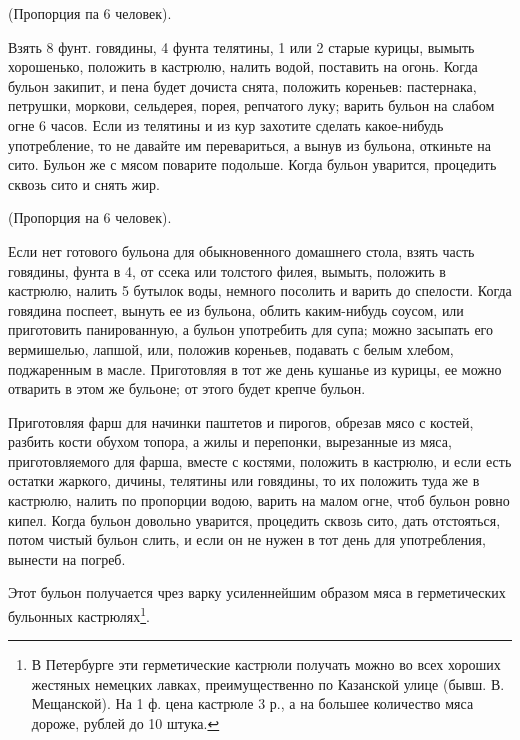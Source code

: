 
(Пропорция па 6 человек).

Взять 8 фунт. говядины, 4 фунта телятины, 1 или 2 старые курицы, вымыть хорошенько, положить в кастрюлю, налить водой, поставить на огонь. Когда бульон закипит, и пена будет дочиста снята, положить кореньев: пастернака, петрушки, моркови, сельдерея, порея, репчатого луку; варить бульон на слабом огне 6 часов. Если из телятины и из кур захотите сделать какое-нибудь употребление, то не давайте им перевариться, а вынув из бульона, откиньте на сито. Бульон же с мясом поварите подольше. Когда бульон уварится, процедить сквозь сито и снять жир.


(Пропорция на 6 человек).

Если нет готового бульона для обыкновенного домашнего стола, взять часть говядины, фунта в 4, от ссека или толстого филея, вымыть, положить в кастрюлю, налить 5 бутылок воды, немного посолить и варить до спелости. Когда говядина поспеет, вынуть ее из бульона, облить каким-нибудь соусом, или приготовить панированную, а бульон употребить для супа; можно засыпать его вермишелью, лапшой, или, положив кореньев, подавать с белым хлебом, поджаренным в масле. Приготовляя в тот же день кушанье из курицы, ее можно отварить в этом же бульоне; от этого будет крепче бульон.


Приготовляя фарш для начинки паштетов и пирогов, обрезав мясо с костей, разбить кости обухом топора, а жилы и перепонки, вырезанные из мяса, приготовляемого для фарша, вместе с костями, положить в кастрюлю, и если есть остатки жаркого, дичины, телятины или говядины, то их положить туда же в кастрюлю, налить по пропорции водою, варить на малом огне, чтоб бульон ровно кипел. Когда бульон довольно уварится, процедить сквозь сито, дать отстояться, потом чистый бульон слить, и если он не нужен в тот день для употребления, вынести на погреб.


Этот бульон получается чрез варку усиленнейшим образом мяса в герметических бульонных кастрюлях\footnote{В Петербурге эти герметические кастрюли получать можно во всех хороших жестяных немецких лавках, преимущественно по Казанской улице (бывш. В. Мещанской). На 1 ф. цена кастрюле 3 р., а на большее количество мяса дороже, рублей до 10 штука.}.

